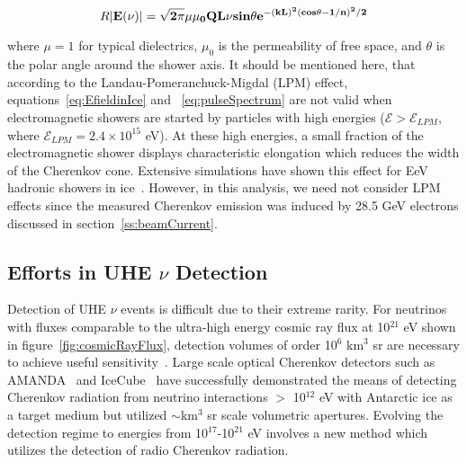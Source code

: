 \begin{equation}
\label{eq:pulseSpectrum}
R|\bf{E}(\nu)| = \sqrt{2\pi}\mu\mu_{0}QL\nu sin\theta e^{-(kL)^{2}(cos\theta - 1/n)^{2}/2}
\end{equation}

\noindent where $\mu = 1$ for typical dielectrics, $\mu_0$ is the permeability of free space, and $\theta$ is the polar angle around the shower axis.  It should be mentioned here, that according to the Landau-Pomeranchuck-Migdal (LPM) effect, equations~\ref{eq:EfieldinIce} and ~\ref{eq:pulseSpectrum} are not valid when electromagnetic showers are started by particles with high energies ($\mathcal{E} > \mathcal{E}_{LPM}$, where $\mathcal{E}_{LPM} = 2.4 \times 10^{15}$ eV).  At these high energies, a small fraction of the electromagnetic shower displays characteristic elongation which reduces the width of the Cherenkov cone.  Extensive simulations have shown this effect for EeV hadronic showers in ice~\cite{Alvarez.1998}.  However, in this analysis, we need not consider LPM effects since the measured Cherenkov emission was induced by 28.5 GeV electrons discussed in section~\ref{ss:beamCurrent}.

\subsection{Efforts in UHE $\nu$ Detection}
\label{ss:askaryanExp}
Detection of UHE $\nu$ events is difficult due to their extreme rarity.  For neutrinos with fluxes comparable to the ultra-high energy cosmic ray flux at 10$^{21}$ eV shown in figure~\ref{fig:cosmicRayFlux}, detection volumes of order 10$^6$ km$^3$ sr are necessary to achieve useful sensitivity~\cite{Berezinsky.1969}.  Large scale optical Cherenkov detectors such as AMANDA~\cite{AMANDA.2006} and IceCube~\cite{IceCube.2006} have successfully demonstrated the means of detecting Cherenkov radiation from neutrino interactions $>$ 10$^{12}$ eV with Antarctic ice as a target medium but utilized $\sim$km$^3$ sr scale volumetric apertures.  Evolving the detection regime to energies from 10$^{17}$-10$^{21}$ eV involves a new method which utilizes the detection of radio Cherenkov radiation.


